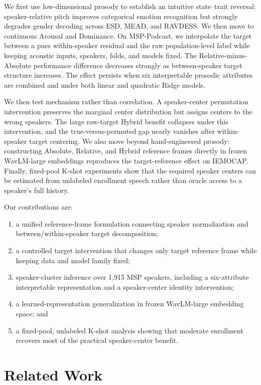 \documentclass[11pt]{article}
\begin{document}
We first use low-dimensional prosody to establish an intuitive state--trait reversal: speaker-relative pitch improves categorical emotion recognition but strongly degrades gender decoding across ESD, MEAD, and RAVDESS.
We then move to continuous Arousal and Dominance.
On MSP-Podcast, we interpolate the target between a pure within-speaker residual and the raw population-level label while keeping acoustic inputs, speakers, folds, and models fixed.
The Relative-minus-Absolute performance difference decreases strongly as between-speaker target structure increases.
The effect persists when six interpretable prosodic attributes are combined and under both linear and quadratic Ridge models.

We then test mechanism rather than correlation.
A speaker-center permutation intervention preserves the marginal center distribution but assigns centers to the wrong speakers.
The large raw-target Hybrid benefit collapses under this intervention, and the true-versus-permuted gap nearly vanishes after within-speaker target centering.
We also move beyond hand-engineered prosody: constructing Absolute, Relative, and Hybrid reference frames directly in frozen WavLM-large embeddings reproduces the target-reference effect on IEMOCAP.
Finally, fixed-pool K-shot experiments show that the required speaker centers can be estimated from unlabeled enrollment speech rather than oracle access to a speaker's full history.

Our contributions are:
\begin{enumerate}
    \item a unified reference-frame formulation connecting speaker normalization and between/within-speaker target decomposition;
    \item a controlled target intervention that changes only target reference frame while keeping data and model family fixed;
    \item speaker-cluster inference over 1,915 MSP speakers, including a six-attribute interpretable representation and a speaker-center identity intervention;
    \item a learned-representation generalization in frozen WavLM-large embedding space; and
    \item a fixed-pool, unlabeled K-shot analysis showing that moderate enrollment recovers most of the practical speaker-center benefit.
\end{enumerate}

\section{Related Work}
\end{document}
